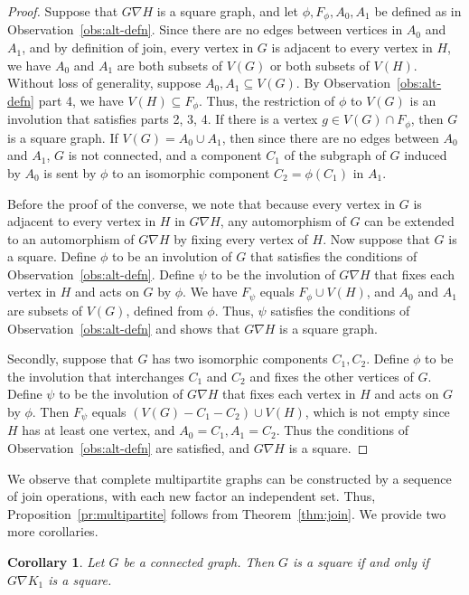 \documentclass{article}
\newtheorem{corollary}[theorem]{Corollary}
\theoremstyle{definition}
\begin{document}
\begin{proof}
Suppose that $G\nabla H$ is a square graph, and let $\phi, F_{\phi}, A_0, A_1$ be defined as in Observation~\ref{obs:alt-defn}. Since there are no edges between vertices in $A_0$ and $A_1$, and by definition of join, every vertex in $G$ is adjacent to every vertex in $H$, we have $A_0$ and $A_1$ are both subsets of $V(G)$ or both subsets of $V(H)$. Without loss of generality, suppose $A_0,A_1\subseteq V(G)$. By Observation~\ref{obs:alt-defn} part 4, we have $V(H)\subseteq F_{\phi}$. Thus, the restriction of $\phi$ to $V(G)$ is an involution that satisfies parts 2, 3, 4. If there is a vertex $g\in V(G)\cap F_{\phi}$, then $G$ is a square graph. If $V(G)=A_0\cup A_1$, then since there are no edges between $A_0$ and $A_1$, $G$ is not connected, and a component $C_1$ of the subgraph of $G$ induced by $A_0$ is sent by $\phi$ to an isomorphic component $C_2=\phi(C_1)$ in $A_1$. 

Before the proof of the converse, we note that because every vertex in $G$ is adjacent to every vertex in $H$ in $G\nabla H$, any automorphism of $G$ can be extended to an automorphism of $G\nabla H$ by fixing every vertex of $H$. 
Now suppose that $G$ is a square. Define $\phi$ to be an involution of $G$ that satisfies the conditions of Observation~\ref{obs:alt-defn}. Define $\psi $ to be the involution of $G\nabla H$ that fixes each vertex in $H$ and acts on $G$ by $\phi$. We have $F_{\psi}$ equals $F_{\phi}\cup V(H)$, and $A_0$ and $A_1$ are subsets of $V(G)$, defined from $\phi$. Thus, $\psi$ satisfies the conditions of Observation~\ref{obs:alt-defn} and shows that $G\nabla H$ is a square graph. 

Secondly, suppose that $G$ has two isomorphic components $C_1, C_2$. Define $\phi$ to be the involution that interchanges $C_1$ and $C_2$ and fixes the other vertices of $G$. Define $\psi $ to be the involution of $G\nabla H$ that fixes each vertex in $H$ and acts on $G$ by $\phi$. Then $F_{\psi}$ equals $(V(G)-C_1-C_2)\cup V(H)$, which is not empty since $H$ has at least one vertex, and $A_0=C_1, A_1=C_2$. Thus the conditions of Observation~\ref{obs:alt-defn} are satisfied, and $G\nabla H$ is a square.
\end{proof}




We observe that complete multipartite graphs can be constructed by a sequence of join operations, with each new factor an independent set. Thus, Proposition~\ref{pr:multipartite} follows from Theorem~\ref{thm:join}. We provide two more corollaries. 
\begin{corollary}
    \label{cor:dominating} 
Let $G$ be a connected graph. Then $G$ is a square if and only if $G \nabla K_1$ is a square.
\end{corollary}
\end{document}
